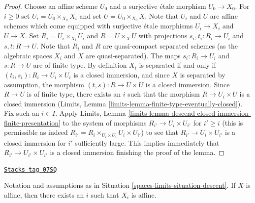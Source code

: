 \begin{proof}
Choose an affine scheme $U_0$ and a surjective \'etale morphism $U_0 \to X_0$.
For $i \geq 0$ set $U_i = U_0 \times_{X_0} X_i$ and set
$U = U_0 \times_{X_0} X$. Note that $U_i$ and $U$ are affine schemes
which come equipped with surjective \'etale morphisms $U_i \to X_i$
and $U \to X$. Set $R_i = U_i \times_{X_i} U_i$ and $R = U \times_X U$
with projections $s_i, t_i : R_i \to U_i$ and $s, t : R \to U$.
Note that $R_i$ and $R$ are quasi-compact separated schemes (as the
algebraic spaces $X_i$ and $X$ are quasi-separated). The maps
$s_i : R_i \to U_i$ and $s : R \to U$ are of finite type.
By definition $X_i$ is separated if and only if
$(t_i, s_i) : R_i \to U_i \times U_i$
is a closed immersion, and since $X$ is separated by assumption,
the morphism $(t, s) : R \to U \times U$ is a closed immersion. Since
$R \to U$ is of finite type, there exists an
$i$ such that the morphism $R \to U_i \times U$ is a closed immersion
(Limits, Lemma \ref{limits-lemma-finite-type-eventually-closed}).
Fix such an $i \in I$. Apply Limits, Lemma
\ref{limits-lemma-descend-closed-immersion-finite-presentation}
to the system of morphisms $R_{i'} \to U_i \times U_{i'}$ for $i' \geq i$
(this is permissible as indeed
$R_{i'} = R_i \times_{U_i \times U_i} U_i \times U_{i'}$)
to see that $R_{i'} \to U_i \times U_{i'}$ is a closed immersion
for $i'$ sufficiently large. This implies immediately
that $R_{i'} \to U_{i'} \times U_{i'}$ is a closed immersion
finishing the proof of the lemma.
\end{proof}

\begin{lemma}
\label{spaces-limits-lemma-limit-is-affine}
\href{https://stacks.math.columbia.edu/tag/07SQ}{\texttt{Stacks tag 07SQ}}

Notation and assumptions as in Situation \ref{spaces-limits-situation-descent}.
If $X$ is affine, then there exists an $i$ such that $X_i$ is affine.
\end{lemma}

